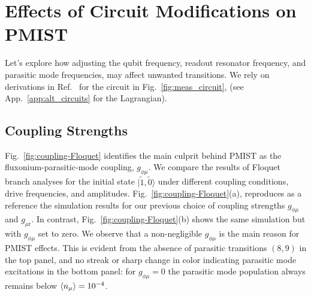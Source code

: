 \documentclass[%
reprint,
superscriptaddress,
 amsmath,amssymb,
 aps,
 prx,
longbibliography,
floatfix,
]{revtex4-2}
\begin{document}
\section{Effects of Circuit Modifications on PMIST}\label{sec:expressions}
Let's explore how adjusting the qubit frequency, readout resonator frequency, and parasitic mode frequencies, may affect unwanted transitions. We rely on derivations in Ref.~\cite{viola2015collective} for the circuit in Fig.~\ref{fig:meas_circuit}, (see App.~\ref{app:alt_circuits} for the Lagrangian).



\subsection{Coupling Strengths} \label{sec:coupling}

Fig.~\ref{fig:coupling-Floquet} identifies the main culprit behind PMIST as the fluxonium-parasitic-mode coupling, $g_{\phi \mu}$. We compare the results of Floquet branch analyses for the initial state $|\tilde{1}, \tilde{0}\rangle$ under different coupling conditions, drive frequencies, and amplitudes. Fig.~\ref{fig:coupling-Floquet}(a), reproduces as a reference the simulation results for our previous choice of coupling strengths $g_{\phi\mu}$ and $g_{\mu \textrm{r}}$. In contrast, Fig.~\ref{fig:coupling-Floquet}(b) shows the same simulation but with $g_{\phi \mu}$ set to zero. We observe that a non-negligible $g_{\phi\mu}$ is the main reason for PMIST effects. This is evident from the absence of parasitic transitions $(8,9)$ in the top panel, and no streak or sharp change in color indicating parasitic mode excitations in the bottom panel:  for $g_{\phi \mu}=0$ the parasitic mode population always remains below $\braket{n_\mu}=10^{-4}$. 
\end{document}
